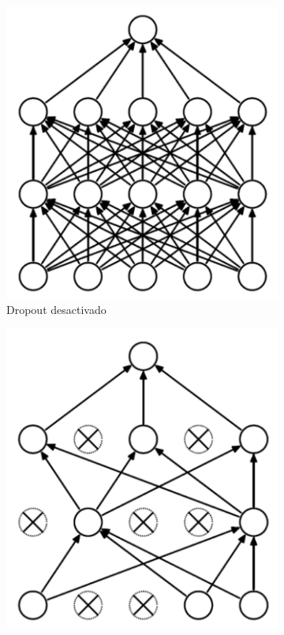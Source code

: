 \begin{itemize}
\begin{figure}[htbp]
        \begin{subfigure}[b]{0.45\textwidth}
            \centering
            \includegraphics[width=\textwidth]{capitulos/cap_02/imagenes/net_without_dropout.png}
            \caption{Dropout desactivado}
            \label{fig:net_deactivate_dropout}
        \end{subfigure}
        \hfill
        \begin{subfigure}[b]{0.45\textwidth}
            \centering
            \includegraphics[width=\textwidth]{capitulos/cap_02/imagenes/net_with_dropout.png}

\end{subfigure}
\end{figure}
\end{itemize}
